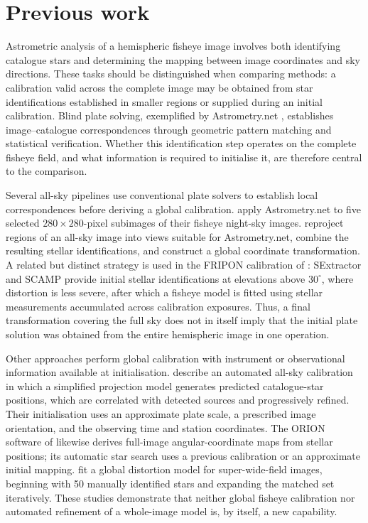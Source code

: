 \section{Previous work}
\label{sec:previous-work}

Astrometric analysis of a hemispheric fisheye image involves both identifying
catalogue stars and determining the mapping between image coordinates and sky
directions. These tasks should be distinguished when comparing methods: a
calibration valid across the complete image may be obtained from star
identifications established in smaller regions or supplied during an initial
calibration. Blind plate solving, exemplified by Astrometry.net
\citep{Lang2010}, establishes image--catalogue correspondences through geometric
pattern matching and statistical verification. Whether this identification step
operates on the complete fisheye field, and what information is required to
initialise it, are therefore central to the comparison.

Several all-sky pipelines use conventional plate solvers to establish local
correspondences before deriving a global calibration. \citet{Hung2024} apply
Astrometry.net to five selected $280\times280$-pixel subimages of their fisheye
night-sky images. \citet{Yin2025} reproject regions of an all-sky image into
views suitable for Astrometry.net, combine the resulting stellar
identifications, and construct a global coordinate transformation. A related
but distinct strategy is used in the FRIPON calibration of
\citet{Jeanne2019}: SExtractor and SCAMP provide initial stellar
identifications at elevations above $30^\circ$, where distortion is less severe,
after which a fisheye model is fitted using stellar measurements accumulated
across calibration exposures. Thus, a final transformation covering the full
sky does not in itself imply that the initial plate solution was obtained from
the entire hemispheric image in one operation.

Other approaches perform global calibration with instrument or observational
information available at initialisation. \citet{Barghini2019} describe an
automated all-sky calibration in which a simplified projection model generates
predicted catalogue-star positions, which are correlated with detected sources
and progressively refined. Their initialisation uses an approximate plate
scale, a prescribed image orientation, and the observing time and station
coordinates. The ORION software of \citet{AntunaSanchez2022}
likewise derives full-image angular-coordinate maps from stellar positions;
its automatic star search uses a previous calibration or an approximate initial
mapping. \citet{Yang2025} fit a global distortion model for super-wide-field
images, beginning with 50 manually identified stars and expanding the matched
set iteratively. These studies demonstrate that neither global fisheye
calibration nor automated refinement of a whole-image model is, by itself,
a new capability.

